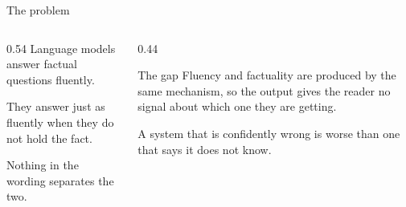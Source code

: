 %

{
\begin{frame}[plain]
  \titlepage
\end{frame}}

\begin{frame}{The problem}
  \begin{columns}[T]
    \begin{column}{0.54\textwidth}
      \agrraggedright
      Language models answer factual questions \alert{fluently}.

      \vspace{4mm}
      They answer just as fluently when they \alert{do not hold the fact}.

      \vspace{4mm}
      Nothing in the wording separates the two.
    \end{column}
    \begin{column}{0.44\textwidth}
      \agrraggedright
      \begin{block}{The gap}
        \agrraggedright
        Fluency and factuality are produced by the same mechanism, so the
        output gives the reader no signal about which one they are getting.
      \end{block}
      \vspace{3mm}
      A system that is confidently wrong is worse than one that says it
      does not know.
    \end{column}
  \end{columns}
\end{frame}

